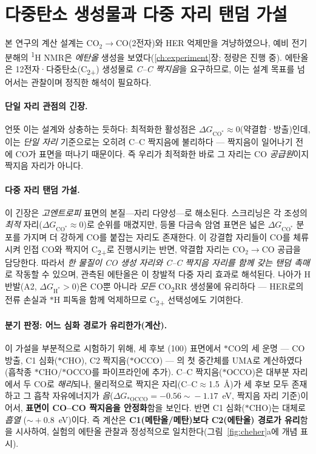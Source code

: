 \documentclass[11pt,a4paper]{report}
\newcommand{\dGCO}{\Delta G_{\mathrm{CO^*}}}
\newcommand{\dGH}{\Delta G_{\mathrm{H^*}}}
\begin{document}
\section{다중탄소 생성물과 다중 자리 탠덤 가설}
\label{sec:tandem}
본 연구의 계산 설계는 CO$_2\!\to\!$CO(2전자)와 HER 억제만을 겨냥하였으나, 예비 전기분해의
\textsuperscript{1}H NMR은 \emph{에탄올} 생성을 보였다(\ref{ch:experiment}장; 정량은 진행 중).
에탄올은 12전자·다중탄소(C\textsubscript{2+}) 생성물로 \emph{C--C 짝지음}을 요구하므로, 이는
설계 목표를 넘어서는 관찰이며 정직한 해석이 필요하다.

\paragraph{단일 자리 관점의 긴장.} 언뜻 이는 설계와 상충하는 듯하다: 최적화한 활성점은
$\dGCO\!\approx\!0$(약결합·방출)인데, 이는 \emph{단일 자리} 기준으로는 오히려 C--C 짝지음에
불리하다 --- 짝지음이 일어나기 전에 CO가 표면을 떠나기 때문이다. 즉 우리가 최적화한 바로 그 자리는
CO \emph{공급원}이지 짝지음 자리가 아니다.

\paragraph{다중 자리 탠덤 가설.} 이 긴장은 \emph{고엔트로피} 표면의 본질---자리 다양성---로 해소된다.
스크리닝은 각 조성의 \emph{최적} 자리($\dGCO\!\approx\!0$)로 순위를 매겼지만, 등몰 다금속 암염
표면은 넓은 $\dGCO$ 분포를 가지며 더 강하게 CO를 붙잡는 자리도 존재한다. 이 강결합 자리들이 CO를
체류시켜 인접 CO와 짝지어 C\textsubscript{2+}로 진행시키는 반면, 약결합 자리는 CO$_2\!\to\!$CO
공급을 담당한다. 따라서 \emph{한 물질이 CO 생성 자리와 C--C 짝지음 자리를 함께 갖는 탠덤 촉매}로
작동할 수 있으며, 관측된 에탄올은 이 창발적 다중 자리 효과로 해석된다. 나아가 H 반발(A2, $\dGH>0$)은
CO뿐 아니라 \emph{모든} CO\textsubscript{2}RR 생성물에 유리하다 --- HER로의 전류 손실과 $*$H 피독을
함께 억제하므로 C\textsubscript{2+} 선택성에도 기여한다.

\paragraph{분기 판정: 어느 심화 경로가 유리한가(계산).} 이 가설을 부분적으로 시험하기 위해, 세 후보
(100) 표면에서 $*$CO의 세 운명 --- CO 방출, C1 심화($*$CHO), C2 짝지음($*$OCCO) --- 의 첫 중간체를
UMA로 계산하였다(흡착종 $*$CHO/$*$OCCO를 파이프라인에 추가). C--C 짝지음($*$OCCO)은 대부분 자리에서
두 CO로 \emph{해리}되나, 물리적으로 짝지은 자리(C--C$\approx$1.5~\AA)가 세 후보 모두 존재하고 그 흡착
자유에너지가 \emph{음}($\Delta G_{*\mathrm{OCCO}}=-0.56\!\sim\!-1.17$~eV, 짝지음 자리 기준)이어서,
\textbf{표면이 CO--CO 짝지음을 안정화}함을 보인다. 반면 C1 심화($*$CHO)는 대체로 \emph{흡열}
($\sim\!+0.8$~eV)이다. 즉 계산은 \textbf{C1(메탄올/메탄)보다 C2(에탄올) 경로가 유리}함을 시사하여,
실험의 에탄올 관찰과 정성적으로 일치한다(그림~\ref{fig:cheher}a에 개념 표시).
\end{document}
